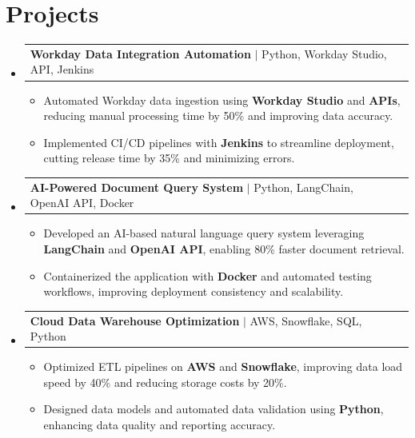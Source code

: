 \documentclass[letterpaper,11pt]{article}
\makeatletter
\newcommand{\resumeItem}[1]{
  \item\footnotesize{
    {#1 \vspace{-2pt}}
  }
}
\newcommand{\resumeProjectHeading}[2]{
    \item
    \begin{tabular*}{1.001\textwidth}{l@{\extracolsep{\fill}}r}
      \small#1 & \textbf{\small #2}\\
    \end{tabular*}\vspace{-7pt}
}
\newcommand{\resumeSubHeadingListStart}{\begin{itemize}[leftmargin=0pt, label={}]}
\newcommand{\resumeSubHeadingListEnd}{\end{itemize}}
\newcommand{\resumeItemListStart}{\begin{itemize}[leftmargin=*]}
\newcommand{\resumeItemListEnd}{\end{itemize}\vspace{-5pt}}
\makeatother
\begin{document}
\section{Projects}
    \vspace{-5pt}
    \resumeSubHeadingListStart

      \resumeProjectHeading
          {\textbf{Workday Data Integration Automation} $|$ Python, Workday Studio, API, Jenkins}{ }
        \resumeItemListStart
            \resumeItem{Automated Workday data ingestion using \textbf{Workday Studio} and \textbf{APIs}, reducing manual processing time by 50\% and improving data accuracy.}
            \resumeItem{Implemented CI/CD pipelines with \textbf{Jenkins} to streamline deployment, cutting release time by 35\% and minimizing errors.}
        \resumeItemListEnd
        \vspace{-12pt}

      \resumeProjectHeading
          {\textbf{AI-Powered Document Query System} $|$ Python, LangChain, OpenAI API, Docker}{ }
        \resumeItemListStart
            \resumeItem{Developed an AI-based natural language query system leveraging \textbf{LangChain} and \textbf{OpenAI API}, enabling 80\% faster document retrieval.}
            \resumeItem{Containerized the application with \textbf{Docker} and automated testing workflows, improving deployment consistency and scalability.}
        \resumeItemListEnd
        \vspace{-12pt}

      \resumeProjectHeading
          {\textbf{Cloud Data Warehouse Optimization} $|$ AWS, Snowflake, SQL, Python}{ }
        \resumeItemListStart
            \resumeItem{Optimized ETL pipelines on \textbf{AWS} and \textbf{Snowflake}, improving data load speed by 40\% and reducing storage costs by 20\%.}
            \resumeItem{Designed data models and automated data validation using \textbf{Python}, enhancing data quality and reporting accuracy.}
        \resumeItemListEnd

    \resumeSubHeadingListEnd
\end{document}
